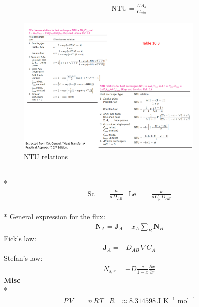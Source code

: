 \begin{datasheet}
\begin{align*}
  \text{NTU} = \frac{UA_{s}}{C_{\text{min}}} 
\end{align*}

\begin{figure}[h!]%
  \begin{center}%
    \includegraphics[width=0.8\textwidth,clip]{figures/HE_NTU1}
  \end{center}
  \caption{NTU relations}
\end{figure}


\\*
\begin{align*}
  \text{Sc} &= \frac{\mu}{\rho\,D_{AB}} & \text{Le} &= \frac{k}{\rho\,C_p\,D_{AB}}
\end{align*}
\\*
General expression for the flux:
\begin{align*}
  \bm{N}_{A} = \bm{J}_A + x_A \sum_B \bm{N}_B
\end{align*}
Fick's law:
\begin{align*}
  \bm{J}_{A} = - D_{AB}\,\nabla C_A
\end{align*}
Stefan's law:
\begin{align*}
  N_{s,r} = -D \frac{c}{1-x}\frac{\partial x}{\partial r}
\end{align*}
{\bf Misc}\\*
\begin{align*}
  P\,V &= n\,R\,T & 
  R&\approx8.314598~\text{J K}^{-1}\text{ mol}^{-1} 
\end{align*}
\end{datasheet}
